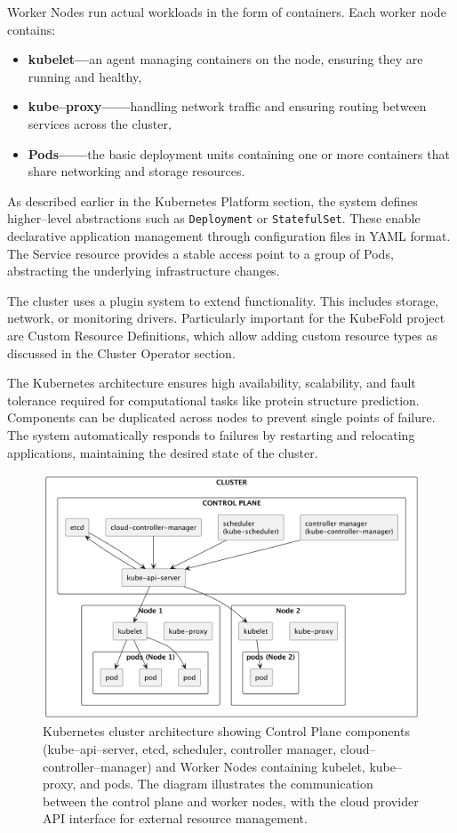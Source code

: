 Worker Nodes run actual workloads in the form of containers.
Each worker node contains:
\begin{itemize}
    \item \textbf{kubelet—}an agent managing containers on the node, ensuring they are running and healthy,
    \item \textbf{kube--proxy——}handling network traffic and ensuring routing between services across the cluster,
    \item \textbf{Pods——}the basic deployment units containing one or more containers that share networking and storage resources.
\end{itemize}

As described earlier in the Kubernetes Platform section, the system defines higher--level abstractions such as \texttt{Deployment} or \texttt{StatefulSet}.
These enable declarative application management through configuration files in YAML format.
The Service resource provides a stable access point to a group of Pods, abstracting the underlying infrastructure changes.

The cluster uses a plugin system to extend functionality.
This includes storage, network, or monitoring drivers.
Particularly important for the KubeFold project are Custom Resource Definitions, which allow adding custom resource types as discussed in the Cluster Operator section.

The Kubernetes architecture ensures high availability, scalability, and fault tolerance required for computational tasks like protein structure prediction.
Components can be duplicated across nodes to prevent single points of failure.
The system automatically responds to failures by restarting and relocating applications, maintaining the desired state of the cluster.

\begin{figure}[htbp]
    \centering
    \includegraphics[width=\textwidth]{images/kubernetes}
    \caption{Kubernetes cluster architecture showing Control Plane components (kube--api--server, etcd, scheduler, controller manager, cloud--controller--manager) and Worker Nodes containing kubelet, kube--proxy, and pods. The diagram illustrates the communication between the control plane and worker nodes, with the cloud provider API interface for external resource management.}
    \label{fig:kubernetes-architecture}
\end{figure}

